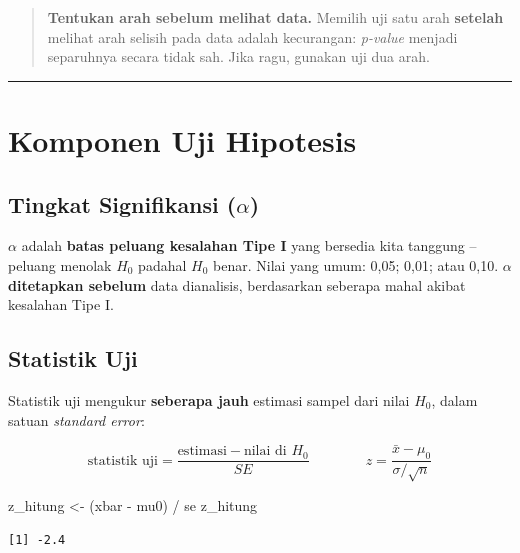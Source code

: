 \documentclass[
  indonesian,
  letterpaper,
]{book}
\newenvironment{Shaded}{\begin{snugshade}}{\end{snugshade}}
\newcommand{\NormalTok}[1]{\textcolor[rgb]{0.00,0.23,0.31}{#1}}
\newcommand{\OtherTok}[1]{\textcolor[rgb]{0.00,0.23,0.31}{#1}}
\newcommand{\SpecialCharTok}[1]{\textcolor[rgb]{0.37,0.37,0.37}{#1}}
\begin{document}
\begin{quote}
\textbf{Tentukan arah sebelum melihat data.} Memilih uji satu arah
\textbf{setelah} melihat arah selisih pada data adalah kecurangan:
\emph{p-value} menjadi separuhnya secara tidak sah. Jika ragu, gunakan
uji dua arah.
\end{quote}

\begin{center}\rule{0.5\linewidth}{0.5pt}\end{center}


\chapter{Komponen Uji Hipotesis}\label{komponen-uji-hipotesis}

\section{\texorpdfstring{Tingkat Signifikansi
(\(\alpha\))}{Tingkat Signifikansi (\textbackslash alpha)}}\label{tingkat-signifikansi-alpha}

\(\alpha\) adalah \textbf{batas peluang kesalahan Tipe I} yang bersedia
kita tanggung -- peluang menolak \(H_0\) padahal \(H_0\) benar. Nilai
yang umum: 0,05; 0,01; atau 0,10. \(\alpha\) \textbf{ditetapkan sebelum}
data dianalisis, berdasarkan seberapa mahal akibat kesalahan Tipe I.

\section{Statistik Uji}\label{statistik-uji}

Statistik uji mengukur \textbf{seberapa jauh} estimasi sampel dari nilai
\(H_0\), dalam satuan \emph{standard error}:

\[\text{statistik uji} = \frac{\text{estimasi} - \text{nilai di } H_0}{SE} \qquad\qquad z = \frac{\bar{x} - \mu_0}{\sigma/\sqrt{n}}\]

\begin{Shaded}
\begin{Highlighting}[]
\NormalTok{z\_hitung }\OtherTok{\textless{}{-}}\NormalTok{ (xbar }\SpecialCharTok{{-}}\NormalTok{ mu0) }\SpecialCharTok{/}\NormalTok{ se}
\NormalTok{z\_hitung}
\end{Highlighting}
\end{Shaded}

\begin{verbatim}
[1] -2.4
\end{verbatim}
\end{document}
